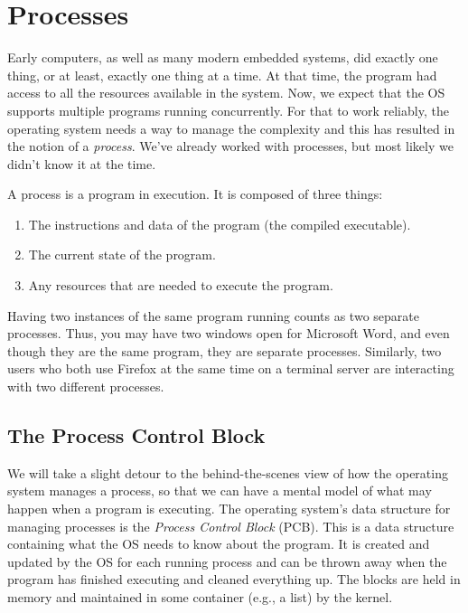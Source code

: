 




\section*{Processes}

Early computers, as well as many modern embedded systems, did exactly one thing, or at least, exactly one thing at a time. At that time, the program had access to all the resources available in the system. Now, we expect that the OS supports multiple programs running concurrently. For that to work reliably, the operating system needs a way to manage the complexity and this has resulted in the notion of a \textit{process}. We've already worked with processes, but most likely we didn't know it at the time.

A process is a program in execution. It is composed of three things:

\begin{enumerate}
	\item The instructions and data of the program (the compiled executable).
	\item The current state of the program.
	\item Any resources that are needed to execute the program.
\end{enumerate}

Having two instances of the same program running counts as two separate processes. Thus, you may have two windows open for Microsoft Word, and even though they are the same program, they are separate processes. Similarly, two users who both use Firefox at the same time on a terminal server are interacting with two different processes.

\subsection*{The Process Control Block}
We will take a slight detour to the behind-the-scenes view of how the operating system manages a process, so that we can have a mental model of what may happen when a program is executing. The operating system's data structure for managing processes is the \textit{Process Control Block} (PCB). This is a data structure containing what the OS needs to know about the program. It is created and updated by the OS for each running process and can be thrown away when the program has finished executing and cleaned everything up. The blocks are held in memory and maintained in some container (e.g., a list) by the kernel.

